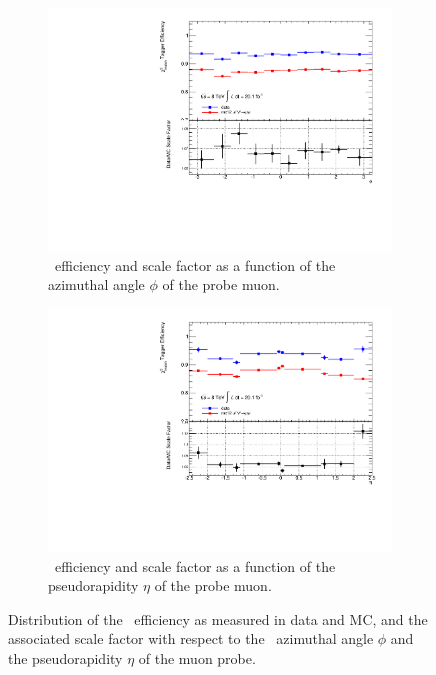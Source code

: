 \begin{figure}[htbp]
  \centering
  \begin{subfigure}[b]{0.75\textwidth}
      \includegraphics[width=\textwidth]{PartCalibration2012/Plots/SFPlots/phi_smt.pdf}
      \caption{\xsm\ efficiency and scale factor as a function of the azimuthal angle $\phi$ of the probe muon.}\label{fig:CalibrationPhi}
  \end{subfigure}

  \begin{subfigure}[b]{0.75\textwidth}
      \includegraphics[width=\textwidth]{PartCalibration2012/Plots/SFPlots/eta_smt.pdf}
      \caption{\xsm\ efficiency and scale factor as a function of the pseudorapidity $\eta$ of the probe muon.}\label{fig:CalibrationEta}
  \end{subfigure}
  \caption[Distribution of the \xsm\ efficiency as measured in data and MC, and the associated scale factor with respect to the azimuthal angle $\phi$ and the pseudorapidity $\eta$ of the muon probe.]{Distribution of the \xsm\ efficiency as measured in data and MC, and the associated scale factor with respect to the~ azimuthal angle $\phi$ and~ the pseudorapidity $\eta$ of the muon probe.}\label{fig:CalibrationAngularResults}
\end{figure}

